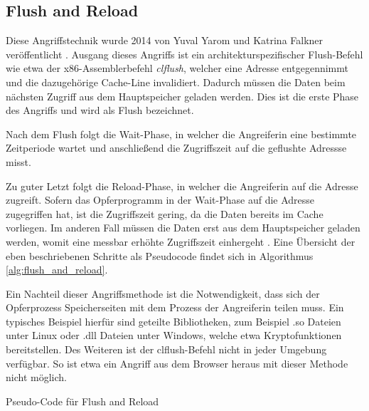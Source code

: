 \newtext

\subsection{Flush and Reload}

Diese Angriffstechnik wurde 2014 von Yuval Yarom
und Katrina Falkner veröffentlicht \cite{FlushReload}.
Ausgang dieses Angriffs ist ein architekturspezifischer Flush-Befehl wie etwa der x86-Assemblerbefehl \textit{clflush}, welcher eine Adresse entgegennimmt und die dazugehörige Cache-Line invalidiert. 
Dadurch müssen die Daten beim nächsten Zugriff aus dem Hauptspeicher geladen werden. Dies ist die erste Phase des Angriffs und wird als Flush bezeichnet. 

Nach dem Flush folgt die Wait-Phase, in welcher die Angreiferin eine bestimmte Zeitperiode wartet und anschließend die Zugriffszeit auf die geflushte Adressse misst. 

Zu guter Letzt folgt die Reload-Phase, in welcher die Angreiferin auf die Adresse zugreift. Sofern das Opferprogramm in der Wait-Phase auf die Adresse zugegriffen hat, ist die Zugriffszeit gering, da die Daten bereits im Cache vorliegen.
Im anderen Fall müssen die Daten erst aus dem Hauptspeicher geladen werden, womit eine messbar erhöhte Zugriffszeit einhergeht \cite{FlushReload}. Eine Übersicht der eben beschriebenen Schritte als Pseudocode findet sich in Algorithmus \ref{alg:flush_and_reload}.

Ein Nachteil dieser Angriffsmethode ist die Notwendigkeit, dass sich der Opferprozess Speicherseiten mit dem Prozess der Angreiferin teilen muss. 
Ein typisches Beispiel hierfür sind geteilte Bibliotheken, zum Beispiel .so Dateien unter Linux oder .dll Dateien unter Windows, welche etwa Kryptofunktionen bereitstellen. Des Weiteren ist der clflush-Befehl nicht in jeder Umgebung verfügbar. So ist etwa ein Angriff aus dem Browser heraus mit dieser Methode nicht möglich. 



\begin{algorithm}[h]
\DontPrintSemicolon
\caption{Pseudo-Code für Flush and Reload}
\label{alg:flush_and_reload}


\newtextend

\end{algorithm}

